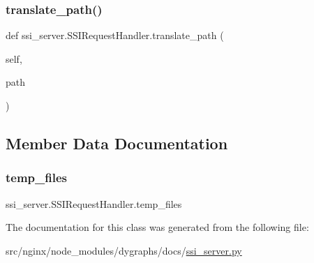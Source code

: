 \subsubsection{\texorpdfstring{translate\+\_\+path()}{translate\_path()}}
{\footnotesize\ttfamily def ssi\+\_\+server.\+S\+S\+I\+Request\+Handler.\+translate\+\_\+path (\begin{DoxyParamCaption}\item[{}]{self,  }\item[{}]{path }\end{DoxyParamCaption})}



\subsection{Member Data Documentation}
\mbox{\label{classssi__server_1_1SSIRequestHandler_afb75305b5cb2a913599b40810aeeeb68}} 
\subsubsection{\texorpdfstring{temp\+\_\+files}{temp\_files}}
{\footnotesize\ttfamily ssi\+\_\+server.\+S\+S\+I\+Request\+Handler.\+temp\+\_\+files}



The documentation for this class was generated from the following file\+:\begin{DoxyCompactItemize}
\item 
src/nginx/node\+\_\+modules/dygraphs/docs/\hyperlink{ssi__server_8py}{ssi\+\_\+server.\+py}\end{DoxyCompactItemize}
